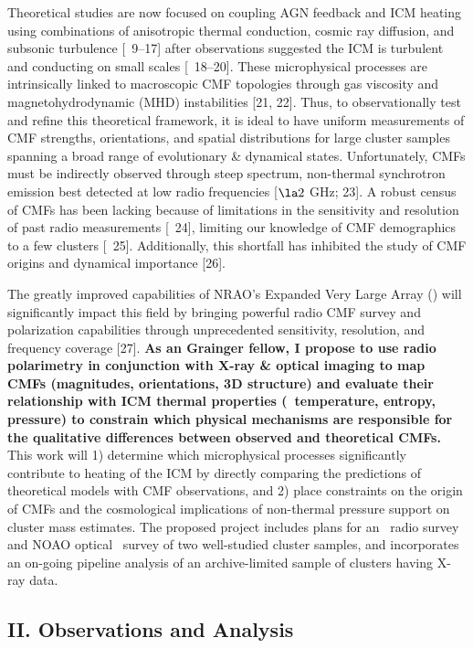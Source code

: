 \documentclass[letterpaper,11pt]{article}
\begin{document}
Theoretical studies are now focused on coupling AGN feedback and ICM
heating using combinations of anisotropic thermal conduction, cosmic
ray diffusion, and subsonic turbulence [\eg\ 9--17] after observations
suggested the ICM is turbulent and conducting on small scales
[\eg\ 18--20]. These microphysical processes are intrinsically linked
to macroscopic CMF topologies through gas viscosity and
magnetohydrodynamic (MHD) instabilities [21, 22]. Thus, to
observationally test and refine this theoretical framework, it is
ideal to have uniform measurements of CMF strengths, orientations, and
spatial distributions for large cluster samples spanning a broad range
of evolutionary \& dynamical states. Unfortunately, CMFs must be
indirectly observed through steep spectrum, non-thermal synchrotron
emission best detected at low radio frequencies [$\la 2$ GHz; 23]. A
robust census of CMFs has been lacking because of limitations in the
sensitivity and resolution of past radio measurements [\eg\ 24],
limiting our knowledge of CMF demographics to a few clusters
[\eg\ 25]. Additionally, this shortfall has inhibited the study of CMF
origins and dynamical importance [26].

The greatly improved capabilities of NRAO's Expanded Very Large Array
(\evla) will significantly impact this field by bringing powerful
radio CMF survey and polarization capabilities through unprecedented
sensitivity, resolution, and frequency coverage [27]. {\bf{As an
    Grainger fellow, I propose to use radio polarimetry in conjunction
    with X-ray \& optical imaging to map CMFs (magnitudes,
    orientations, 3D structure) and evaluate their relationship with
    ICM thermal properties (\eg\ temperature, entropy, pressure) to
    constrain which physical mechanisms are responsible for the
    qualitative differences between observed and theoretical CMFs.}}
This work will 1) determine which microphysical processes
significantly contribute to heating of the ICM by directly comparing
the predictions of theoretical models with CMF observations, and 2)
place constraints on the origin of CMFs and the cosmological
implications of non-thermal pressure support on cluster mass
estimates. The proposed project includes plans for an \evla\ radio
survey and NOAO optical \halpha\ survey of two well-studied cluster
samples, and incorporates an on-going pipeline analysis of an
archive-limited sample of clusters having X-ray data.

\subsection*{II. Observations and Analysis}
\end{document}
